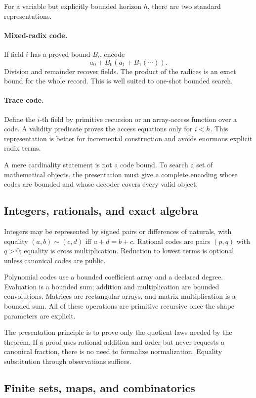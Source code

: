 For a variable but explicitly bounded horizon \(h\), there are two standard representations.

\paragraph{Mixed-radix code.}
If field \(i\) has a proved bound \(B_i\), encode
\[
  a_0+B_0(a_1+B_1(\cdots)).
\]
Division and remainder recover fields.  The product of the radices is an exact bound for the whole
record.  This is well suited to one-shot bounded search.

\paragraph{Trace code.}
Define the \(i\)-th field by primitive recursion or an array-access function over a code.  A validity
predicate proves the access equations only for \(i<h\).  This representation is better for
incremental construction and avoids enormous explicit radix terms.

A mere cardinality statement is not a code bound.  To search a set of mathematical objects, the
presentation must give a complete encoding whose codes are bounded and whose decoder covers every
valid object.

\subsection{Integers, rationals, and exact algebra}

Integers may be represented by signed pairs or differences of naturals, with equality
\((a,b)\sim(c,d)\) iff \(a+d=b+c\).  Rational codes are pairs \((p,q)\) with \(q>0\); equality is
cross multiplication.  Reduction to lowest terms is optional unless canonical codes are public.

Polynomial codes use a bounded coefficient array and a declared degree.  Evaluation is a bounded
sum; addition and multiplication are bounded convolutions.  Matrices are rectangular arrays, and
matrix multiplication is a bounded sum.  All of these operations are primitive recursive once the
shape parameters are explicit.

The presentation principle is to prove only the quotient laws needed by the theorem.  If a proof
uses rational addition and order but never requests a canonical fraction, there is no need to
formalize normalization.  Equality substitution through observations suffices.

\subsection{Finite sets, maps, and combinatorics}

